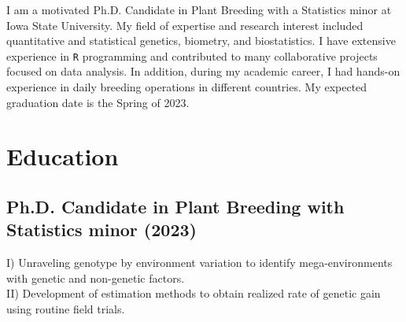 \documentclass[]{mdkrause_cv_openfont}
\begin{document}
%
%

%
%

%
%

\begin{minipage}[t]{1\textwidth} 


\vspace{1 mm}

I am a motivated Ph.D. Candidate in Plant Breeding with a Statistics minor at Iowa State University. My field of expertise and research interest included quantitative and statistical genetics, biometry, and biostatistics. I have extensive experience in \texttt{R} programming and contributed to many collaborative projects focused on data analysis. In addition, during my academic career, I had hands-on experience in daily breeding operations in different countries. My expected graduation date is the Spring of 2023.



\section{Education} 

\sectionsep

\subsection{Ph.D. Candidate in Plant Breeding with Statistics minor (2023)}
 I) Unraveling genotype by environment variation to identify mega-environments with genetic and non-genetic factors. \\ 
\hspace{1.55 cm} II) Development of estimation methods to obtain realized rate of genetic gain using routine field trials.


\end{minipage}
\end{document}

